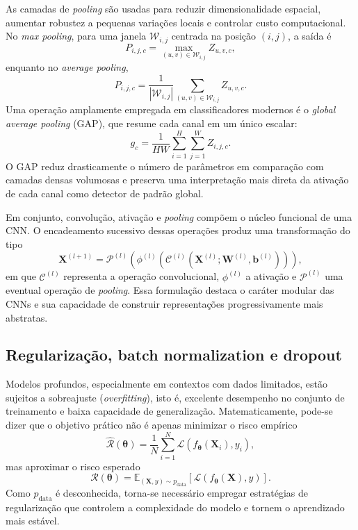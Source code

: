 \documentclass[tcc,capa]{texufpel}
\begin{document}
As camadas de \textit{pooling} são usadas para reduzir dimensionalidade espacial, aumentar robustez a pequenas variações locais e controlar custo computacional. No \textit{max pooling}, para uma janela $\mathcal{W}_{i,j}$ centrada na posição $(i,j)$, a saída é
\begin{equation}
P_{i,j,c} = \max_{(u,v)\in\mathcal{W}_{i,j}} Z_{u,v,c},
\end{equation}
enquanto no \textit{average pooling},
\begin{equation}
P_{i,j,c} = \frac{1}{|\mathcal{W}_{i,j}|}\sum_{(u,v)\in\mathcal{W}_{i,j}} Z_{u,v,c}.
\end{equation}
Uma operação amplamente empregada em classificadores modernos é o \textit{global average pooling} (GAP), que resume cada canal em um único escalar:
\begin{equation}
g_c = \frac{1}{H W}\sum_{i=1}^{H}\sum_{j=1}^{W} Z_{i,j,c}.
\end{equation}
O GAP reduz drasticamente o número de parâmetros em comparação com camadas densas volumosas e preserva uma interpretação mais direta da ativação de cada canal como detector de padrão global.

Em conjunto, convolução, ativação e \textit{pooling} compõem o núcleo funcional de uma CNN. O encadeamento sucessivo dessas operações produz uma transformação do tipo
\begin{equation}
\mathbf{X}^{(l+1)}
=
\mathcal{P}^{(l)}\!\left(
\phi^{(l)}\!\left(
\mathcal{C}^{(l)}(\mathbf{X}^{(l)};\mathbf{W}^{(l)},\mathbf{b}^{(l)})
\right)\right),
\end{equation}
em que $\mathcal{C}^{(l)}$ representa a operação convolucional, $\phi^{(l)}$ a ativação e $\mathcal{P}^{(l)}$ uma eventual operação de \textit{pooling}. Essa formulação destaca o caráter modular das CNNs e sua capacidade de construir representações progressivamente mais abstratas.

\subsection{Regularização, batch normalization e dropout}

Modelos profundos, especialmente em contextos com dados limitados, estão sujeitos a sobreajuste (\textit{overfitting}), isto é, excelente desempenho no conjunto de treinamento e baixa capacidade de generalização. Matematicamente, pode-se dizer que o objetivo prático não é apenas minimizar o risco empírico
\begin{equation}
\hat{\mathcal{R}}(\boldsymbol{\theta}) = \frac{1}{N}\sum_{i=1}^{N}\mathcal{L}(f_{\boldsymbol{\theta}}(\mathbf{X}_i),y_i),
\end{equation}
mas aproximar o risco esperado
\begin{equation}
\mathcal{R}(\boldsymbol{\theta}) = \mathbb{E}_{(\mathbf{X},y)\sim p_{\text{data}}}
\left[\mathcal{L}(f_{\boldsymbol{\theta}}(\mathbf{X}),y)\right].
\end{equation}
Como $p_{\text{data}}$ é desconhecida, torna-se necessário empregar estratégias de regularização que controlem a complexidade do modelo e tornem o aprendizado mais estável.
\end{document}
